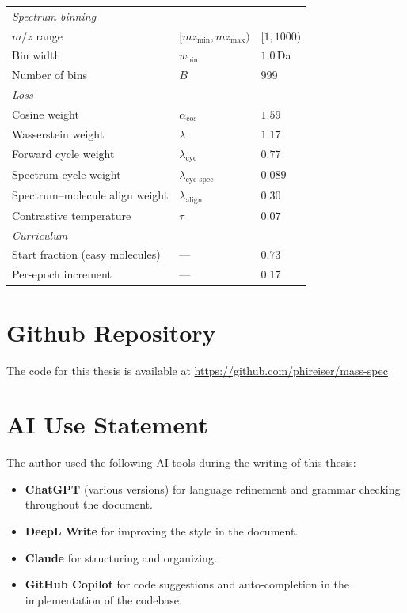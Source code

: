 {\begin{longtable}{@{}l l p{6cm}@{}}
        \hline
        \multicolumn{3}{l}{\emph{Spectrum binning}} \\
        $m/z$ range                       & $[mz_{\min}, mz_{\max})$         & $[1, 1000)$ \\
        Bin width                         & $w_{\mathrm{bin}}$               & $1.0$\,Da \\
        Number of bins                    & $B$                              & $999$ \\
        \hline
        \multicolumn{3}{l}{\emph{Loss}} \\
        Cosine weight                     & $\alpha_{\cos}$                  & $1.59$ \\
        Wasserstein weight                & $\lambda$                        & $1.17$ \\
        Forward cycle weight              & $\lambda_{\mathrm{cyc}}$         & $0.77$ \\
        Spectrum cycle weight             & $\lambda_{\text{cyc-spec}}$      & $0.089$ \\
        Spectrum--molecule align weight   & $\lambda_{\text{align}}$         & $0.30$ \\
        Contrastive temperature           & $\tau$                           & $0.07$ \\
        \hline
        \multicolumn{3}{l}{\emph{Curriculum}} \\
        Start fraction (easy molecules)   & ---                              & $0.73$ \\
        Per-epoch increment               & ---                              & $0.17$ \\
        \hline
\end{longtable}}

\section{Github Repository}
The code for this thesis is available at
\href{https://github.com/phireiser/mass-spec}{https://github.com/phireiser/mass-spec}

\section{AI Use Statement}
The author used the following AI tools during the writing of this thesis:
\begin{itemize}
    \item \textbf{ChatGPT} (various versions) for language refinement and grammar checking throughout the document.
    \item \textbf{DeepL Write} for improving the style in the document.
    \item \textbf{Claude} for structuring and organizing.
    \item \textbf{GitHub Copilot} for code suggestions and auto-completion in the implementation of the codebase.
\end{itemize}
